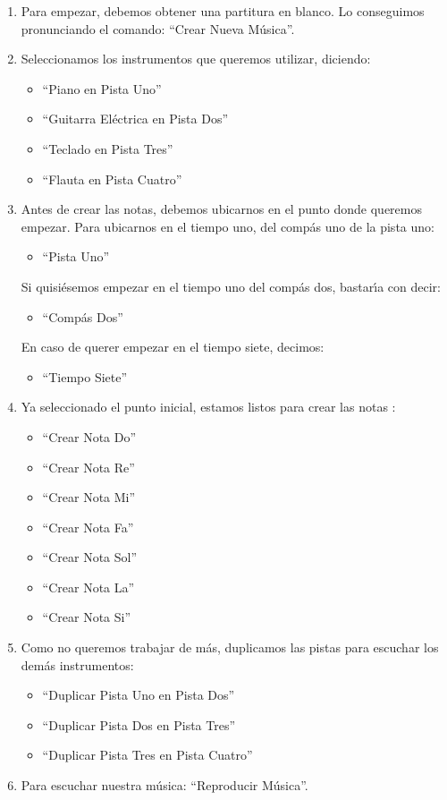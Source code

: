 \begin{enumerate}
  \item Para empezar, debemos obtener una partitura en blanco. Lo conseguimos pronunciando el comando: 
  ``Crear Nueva M\'usica''.

  \item Seleccionamos los instrumentos que queremos utilizar, diciendo:
    \begin{itemize}
      \item ``Piano en Pista Uno''
      \item ``Guitarra El\'ectrica en Pista Dos''
      \item ``Teclado en Pista Tres''
      \item ``Flauta en Pista Cuatro''
    \end{itemize}

  \item Antes de crear las notas, debemos ubicarnos en el punto donde queremos empezar.
  Para ubicarnos en el tiempo uno, del comp\'as uno de la pista uno:
  \begin{itemize}
    \item ``Pista Uno''
  \end{itemize}
        Si quisi\'esemos empezar en el tiempo uno del comp\'as dos, bastar{\'\i}a con decir:
  \begin{itemize}
    \item ``Comp\'as Dos''
  \end{itemize}
        En caso de querer empezar en el tiempo siete, decimos:
  \begin{itemize}
    \item ``Tiempo Siete''
  \end{itemize}

  \item Ya seleccionado el punto inicial, estamos listos para crear las notas :
  \begin{itemize}
    \item ``Crear Nota Do''
    \item ``Crear Nota Re''
    \item ``Crear Nota Mi''
    \item ``Crear Nota Fa''
    \item ``Crear Nota Sol''
    \item ``Crear Nota La''
    \item ``Crear Nota Si''
  \end{itemize}


  \item Como no queremos trabajar de m\'as, duplicamos las pistas para escuchar los dem\'as instrumentos:
  \begin{itemize}
    \item ``Duplicar Pista Uno en Pista Dos''
    \item ``Duplicar Pista Dos en Pista Tres''
    \item ``Duplicar Pista Tres en Pista Cuatro''
  \end{itemize}

  \item Para escuchar nuestra m\'usica: ``Reproducir M\'usica''.

\end{enumerate}


